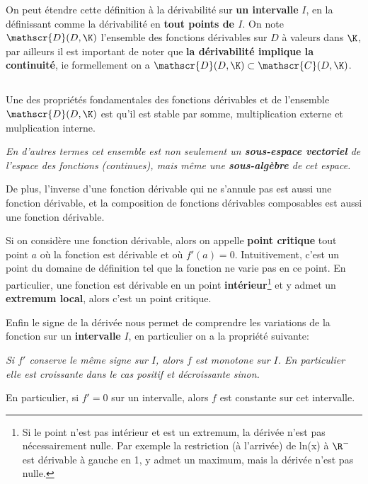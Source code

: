 On peut étendre cette définition à la dérivabilité sur \textbf{un intervalle} \(I\), en la définissant comme la dérivabilité en \textbf{tout points de \(I\)}.\+
On note \(\mathscr{D}(D, \K)\) l'ensemble des fonctions dérivables sur \(D\) à valeurs dans \(\K\), par ailleurs il est important de noter que \textbf{la dérivabilité implique la continuité}, ie formellement on a \(\mathscr{D}(D, \K) \subset \mathscr{C}(D, \K)\).

\subsection*{}
Une des propriétés fondamentales des fonctions dérivables et de l'ensemble \(\mathscr{D}(D, \K)\) est qu'il est stable par somme, multiplication externe et mulplication interne.
\begin{center}
   \textit{
      En d'autres termes cet ensemble est non seulement un \textbf{sous-espace vectoriel} de l'espace des fonctions (continues), mais même une \textbf{sous-algèbre} de cet espace.
   }
\end{center}
De plus, l'inverse d'une fonction dérivable qui ne s'annule pas est aussi une fonction dérivable, et la composition de fonctions dérivables composables est aussi une fonction dérivable.\<

Si on considère une fonction dérivable, alors on appelle \textbf{point critique} tout point \(a\) où la fonction est dérivable et où \(f'(a) = 0\). Intuitivement, c'est un point du domaine de définition tel que la fonction ne varie pas en ce point.\+
En particulier, une fonction est dérivable en un point \textbf{intérieur}\footnote[1]{Si le point n'est pas intérieur et est un extremum, la dérivée n'est pas nécessairement nulle. Par exemple la restriction (à l'arrivée) de ln(x) à \(\R^-\) est dérivable à gauche en 1, y admet un maximum, mais la dérivée n'est pas nulle.} et y admet un \textbf{extremum local}, alors c'est un point critique.\<

Enfin le signe de la dérivée nous permet de comprendre les variations de la fonction sur un \textbf{intervalle} \(I\), en particulier on a la propriété suivante:
\begin{center}
   \textit{Si \(f'\) conserve le même signe sur \(I\), alors \(f\) est monotone sur \(I\). En particulier elle est croissante dans le cas positif et décroissante sinon.}
\end{center}
En particulier, si \(f' = 0\) sur un intervalle, alors \(f\) est constante sur cet intervalle.
\pagebreak 

